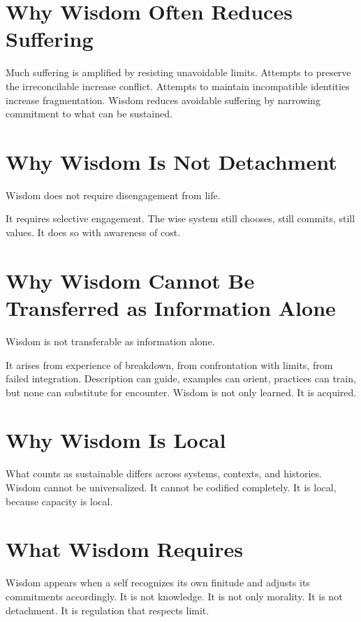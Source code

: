 \documentclass[11pt,twoside,openright]{book}
\begin{document}
\section*{Why Wisdom Often Reduces Suffering}

Much suffering is amplified by resisting unavoidable limits. Attempts to preserve the irreconcilable increase conflict. Attempts to maintain incompatible identities increase fragmentation. Wisdom reduces avoidable suffering by narrowing commitment to what can be sustained.

\section*{Why Wisdom Is Not Detachment}

Wisdom does not require disengagement from life.

It requires selective engagement. The wise system still chooses, still commits, still values. It does so with awareness of cost.

\section*{Why Wisdom Cannot Be Transferred as Information Alone}

Wisdom is not transferable as information alone.

It arises from experience of breakdown, from confrontation with limits, from failed integration. Description can guide, examples can orient, practices can train, but none can substitute for encounter. Wisdom is not only learned. It is acquired.

\section*{Why Wisdom Is Local}

What counts as sustainable differs across systems, contexts, and histories. Wisdom cannot be universalized. It cannot be codified completely. It is local, because capacity is local.

\section*{What Wisdom Requires}

Wisdom appears when a self recognizes its own finitude and adjusts its commitments accordingly. It is not knowledge. It is not only morality. It is not detachment. It is regulation that respects limit.
\end{document}
